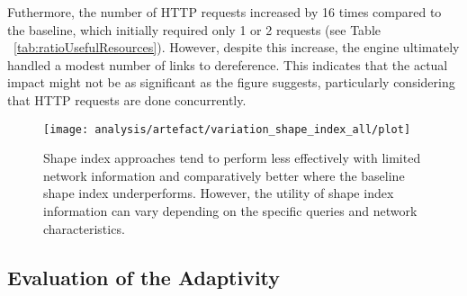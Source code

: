 Futhermore, the number of HTTP requests increased by 16 times compared to the baseline, which initially required only 1 or 2 requests (see Table ~\ref{tab:ratioUsefulResources}). 
However, despite this increase, the engine ultimately handled a modest number of links to dereference.
This indicates that the actual impact might not be as significant as the figure suggests, particularly considering that HTTP requests are done concurrently.



\begin{figure}[h]
    \centering
    \texttt{[image: analysis/artefact/variation\_shape\_index\_all/plot]}
    \caption{
    Shape index approaches tend to perform less effectively with limited network information and comparatively better where the baseline shape index underperforms.
    However, the utility of shape index information can vary depending on the specific queries and network characteristics.
    }
    \label{fig:adaptShapeIndex}
\end{figure}

\subsection{Evaluation of the Adaptivity}

